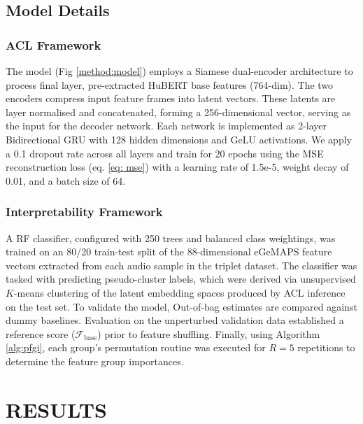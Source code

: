 \documentclass[conference,letterpaper]{IEEEtran}
\begin{document}
\subsection{Model Details}
\label{model:deets}

\subsubsection{ACL Framework} The model (Fig \ref{method:model}) employs a Siamese dual-encoder architecture to process final layer, pre-extracted HuBERT base features (764-dim). The two encoders compress input feature frames into latent vectors. These latents are layer normalised \cite{ba2016layernormalization} and concatenated, forming a 256-dimensional vector, serving as the input for the decoder network. Each network is implemented as 2-layer Bidirectional GRU with 128 hidden dimensions and GeLU \cite{DBLP:journals/corr/HendrycksG16} activations. We apply a 0.1 dropout rate across all layers and train for 20 epochs using the MSE reconstruction loss (eq. \ref{eq: mse}) with a learning rate of 1.5e-5, weight decay of 0.01, and a batch size of 64. 


\subsubsection{Interpretability Framework} A RF classifier, configured with 250 trees and balanced class weightings, was trained on an 80/20 train-test split of the 88-dimensional eGeMAPS feature vectors extracted from each audio sample in the triplet dataset. The classifier was tasked with predicting pseudo-cluster labels, which were derived via unsupervised $K$-means clustering of the latent embedding spaces produced by ACL inference on the test set. To validate the model, Out-of-bag estimates \cite{breiman1996out} are compared against dummy baselines. Evaluation on the unperturbed validation data established a reference score ($\mathcal{F}_{\text{base}}$) prior to feature shuffling. Finally, using Algorithm \ref{alg:pfgi}, each group's permutation routine was executed for $R=5$ repetitions to determine the feature group importances.

\vspace{-0.25cm}
\section{RESULTS}
\end{document}
